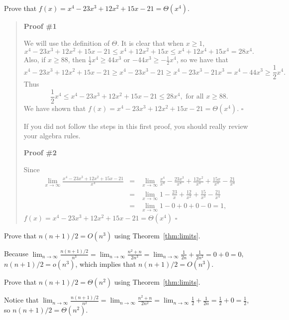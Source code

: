 \newpage %

\begin{exa}
Prove that $f(x)=x^4-23 x^3 + 12x^2 + 15 x - 21=\Theta(x^4)$.
\begin{quote} 
{\bf Proof \#1}

\noindent
We will use the definition of $\Theta$.
It is clear that when $x\geq 1$, 
$$x^4-23 x^3 + 12x^2 + 15 x - 21\leq x^4+12 x^2+15 x
\leq x^4+12 x^4+15 x^4= 28 x^4.$$
Also, if $x\geq 88$, then $\frac{1}{2}x^4\geq 44x^3$ or 
$-44x^3\geq -\frac{1}{2}x^4$,
so we have that
$$x^4-23 x^3 + 12x^2 + 15 x - 21\geq x^4-23 x^3 - 21\geq 
x^4 - 23 x^3 - 21 x^3= x^4 - 44 x^3\geq \frac{1}{2}x^4.$$
Thus
$$\frac{1}{2}x^4\leq x^4-23 x^3 + 12x^2 + 15 x - 21\leq 28 x^4,
\mbox{ for all } x\geq 88.$$
We have shown that $f(x)=x^4-23 x^3 + 12x^2 + 15 x - 21=\Theta(x^4).$
\hfill $\square$

\noindent
If you did not follow the steps in this first proof, you should really
review your algebra rules.

\noindent
{\bf Proof \#2}

\noindent
Since
\begin{eqnarray*}
\lim_{x\rightarrow\infty}\frac{
x^4-23 x^3 + 12x^2 + 15 x - 21}{x^4}
& =& \lim_{x\rightarrow\infty}
\frac{x^4}{ x^4} -\frac{23x^3}{ x^4} + \frac{12x^2}{ x^4} 
+ \frac{15x}{ x^4} - \frac{21}{ x^4}\\
& =& \lim_{x\rightarrow\infty}
1 - \frac{23}{ x}+ \frac{12}{ x^2} + \frac{15}{ x^3} - \frac{21}{ x^4}\\
&=& \lim_{x\rightarrow\infty}
1 - 0 + 0 + 0 - 0=1,
\end{eqnarray*}
$f(x)=x^4-23 x^3 + 12x^2 + 15 x - 21=\Theta(x^4)$
\hfill $\square$
\end{quote}
\end{exa}

\begin{exa}
Prove that $n(n+1)/2=O(n^3)$ using Theorem~\ref{thm:limits}.

\begin{pf}
Because 
${\displaystyle\lim_{n\rightarrow\infty}\frac{n(n+1)/2}{n^3} = 
\lim_{n\rightarrow\infty}\frac{n^2+n}{2n^3} = 
\lim_{n\rightarrow\infty}\frac{1}{2n} +\frac{1}{2n^2}= 0+0=0}$,
$n(n+1)/2=o(n^3)$, which implies that $n(n+1)/2=O(n^3)$.
\end{pf}
\end{exa}

\begin{exer}
Prove that $n(n+1)/2=\Theta(n^2)$ using Theorem~\ref{thm:limits}.

\vspace*{1.7in}
\begin{answer}
Notice that 
${\displaystyle \lim_{n\rightarrow\infty}\frac{n(n+1)/2}{n^2} = 
\lim_{n\rightarrow\infty}\frac{n^2+n}{2n^2} = 
\lim_{n\rightarrow\infty}\frac{1}{2} +\frac{1}{2n}= \frac{1}{2}+0=\frac{1}{2}}$,
so $n(n+1)/2=\Theta(n^2)$.
\end{answer}
\end{exer}


